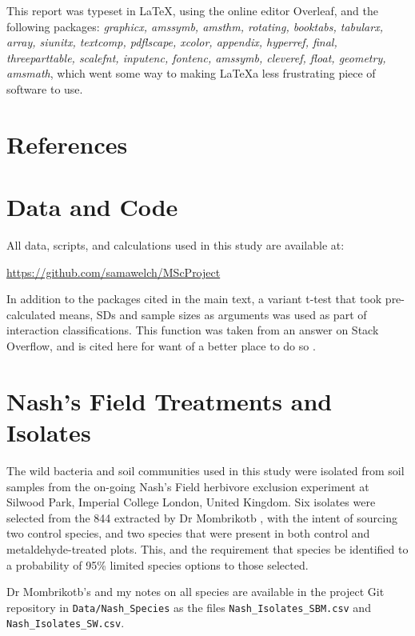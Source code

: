 \documentclass[10pt]{article}
\begin{document}
This report was typeset in \LaTeX, using the online editor Overleaf, and the following packages: \textit{graphicx, amssymb, amsthm, rotating, booktabs, tabularx, array, siunitx,  textcomp, pdflscape, xcolor,  appendix, hyperref, final, threeparttable, scalefnt, inputenc, fontenc, amssymb, cleveref, float, geometry, amsmath}, which went some way to making \LaTeX a less frustrating piece of software to use.   

\section{References}
\label{S:7}

\begin{appendices}

\section{Data and Code}
\label{A:1}

All data, scripts, and calculations used in this study are available at: 

\url{https://github.com/samawelch/MScProject}

In addition to the packages cited in the main text, a variant t-test that took pre-calculated means, SDs and sample sizes as arguments was used as part of interaction classifications. This function was taken from an answer on Stack Overflow, and is cited here for want of a better place to do so \cite{Macro2012}.

\section{Nash's Field Treatments and Isolates}
\label{A:2}

The wild bacteria and soil communities used in this study were isolated from soil samples from the on-going Nash's Field herbivore exclusion experiment \cite{Allan2011ContrastingExperiment} at Silwood Park, Imperial College London, United Kingdom. Six isolates were selected from the 844 extracted by Dr Mombrikotb \cite{Mombrikotb2016}, with the intent of sourcing two control species, and two species that were present in both control and metaldehyde-treated plots. This, and the requirement that species be identified to a probability of 95\% limited species options to those selected. 

Dr Mombrikotb's and my notes on all species are available in the project Git repository in \verb|Data/Nash_Species| as the files \verb|Nash_Isolates_SBM.csv| and \verb|Nash_Isolates_SW.csv|.

\end{appendices}
\end{document}
